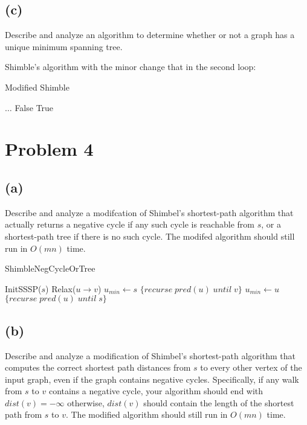 \documentclass[12pt]{article}
\begin{document}
\subsection*{(c)}
Describe and analyze an algorithm to determine whether or not a graph
has a unique minimum spanning tree.

Shimble's algorithm with the minor change that in the second loop:
\begin{algorithm}
\caption{Modified Shimble}
\begin{algorithmic}
  \STATE
  \STATE $\ldots$
  \STATE
      \RETURN False
    \ENDIF
  \RETURN True
  \ENDFOR
\end{algorithmic}
\end{algorithm}


\section*{Problem 4}

\subsection*{(a)}
Describe and analyze a modifcation of Shimbel's shortest-path algorithm
that actually returns a negative cycle if any such cycle is reachable
from $s$, or a shortest-path tree if there is no such cycle. The modifed
algorithm should still run in $O(mn)$ time.

\begin{algorithm}
\caption{ShimbleNegCycleOrTree}
\begin{algorithmic}
    \STATE InitSSSP($s$)
                \STATE Relax($u \rightarrow v$)
            \ENDIF
        \ENDFOR
    \ENDFOR
    \STATE $u_{min} \leftarrow s$
            \RETURN $\{ recurse\; pred(u)\; until\; v \}$
        \ENDIF
            \STATE $u_{min} \leftarrow u$
        \ENDIF
        \RETURN $\{ recurse\; pred(u)\; until\; s \}$
    \ENDFOR
\end{algorithmic}
\end{algorithm}


\subsection*{(b)}
Describe and analyze a modification of Shimbel's shortest-path
algorithm that computes the correct shortest path distances from $s$ to
every other vertex of the input graph, even if the graph contains
negative cycles. Specifically, if any walk from $s$ to $v$ contains a
negative cycle, your algorithm should end with $dist(v) = -\infty$
otherwise, $dist(v)$ should contain the length of the shortest path
from $s$ to $v$. The modified algorithm should still run in $O(mn)$
time.
\end{document}
